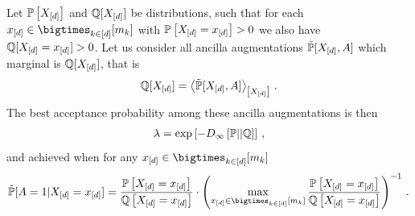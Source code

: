 \begin{theorem}
    Let $\mathbb{P}\left[X_{[d]}\right]$ and $\mathbb{Q}[X_{[d]}]$ be distributions, such that for each $\shortcatindicesin$ with $\mathbb{P}\left[X_{[d]}=x_{[d]}\right]>0$ we also have $\mathbb{Q}[X_{[d]}=x_{[d]}]>0$.
    Let us consider all ancilla augmentations $\tilde{\mathbb{P}}[X_{[d]},A]$ which marginal is $\mathbb{Q}[X_{[d]}]$, that is
    \begin{align*}
        \mathbb{Q}[X_{[d]}]
        = \left\langle \tilde{\mathbb{P}}[X_{[d]},A]\right\rangle_{\left[ X_{[d]} \right]} \, .
    \end{align*}
    The best acceptance probability among these ancilla augmentations is then
    \begin{align*}
        \lambda
        = \mathrm{exp}\left[-D_{\infty}\left[\mathbb{P}||\mathbb{Q}\right]\right] \, ,
    \end{align*}
    and achieved when for any $\shortcatindicesin$
    \begin{align*}
        \secprobat{\avariable=1|\indexedshortcatvariables}
        = \frac{
            \probat{\indexedshortcatvariables}}{\mathbb{Q}\left[\indexedshortcatvariables\right]
        } \cdot \left(\max_{\shortcatindicesin}\frac{\probat{\indexedshortcatvariables}}{\mathbb{Q}\left[\indexedshortcatvariables\right]}
        \right)^{-1} \, .
    \end{align*}
\end{theorem}
